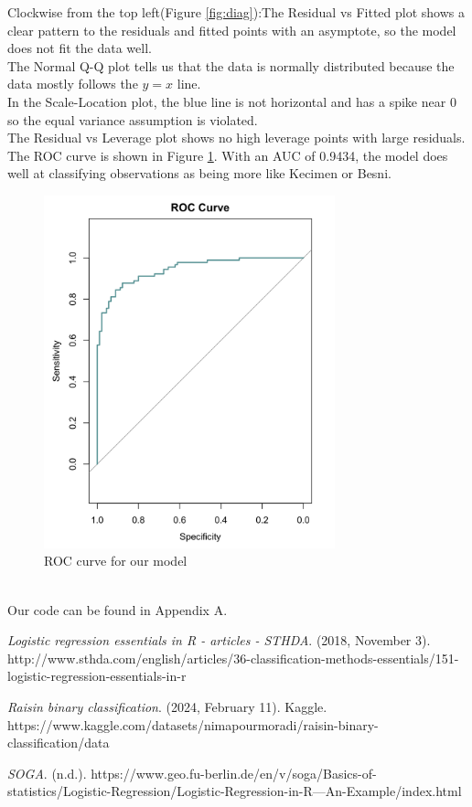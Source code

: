 \documentclass{article}
\begin{document}
\clearpage
Clockwise from the top left(Figure \ref{fig:diag}):The Residual vs Fitted plot shows a clear pattern to the residuals and fitted points with an asymptote, so the model does not fit the data well.\\
The Normal Q-Q plot tells us that the data is normally distributed because the data mostly follows the $y=x$ line.\\
In the Scale-Location plot, the blue line is not horizontal and has a spike near 0 so the equal variance assumption is violated.\\
The Residual vs Leverage plot shows no high leverage points with large residuals. \\
The ROC curve is shown in Figure \ref{fig:roc}. With an AUC of 0.9434, the model does well at classifying observations as being more like Kecimen or Besni.
\begin{figure}[ht]
	\centering
	\includegraphics[width=0.75\textwidth]{roc_curve}
\caption{ROC curve for our model}
\label{fig:roc}
\end{figure} \\
Our code can be found in Appendix A.
\clearpage



\begin{thebibliography}{9}

\emph{Logistic regression essentials in R - articles - STHDA}. (2018, November 3). http://www.sthda.com/english/articles/36-classification-methods-essentials/151-logistic-regression-essentials-in-r

\emph{Raisin binary classification}. (2024, February 11). Kaggle. https://www.kaggle.com/datasets/nimapourmoradi/raisin-binary-classification/data


\emph{SOGA}. (n.d.). https://www.geo.fu-berlin.de/en/v/soga/Basics-of-statistics/Logistic-Regression/Logistic-Regression-in-R---An-Example/index.html


\end{thebibliography}
\end{document}
